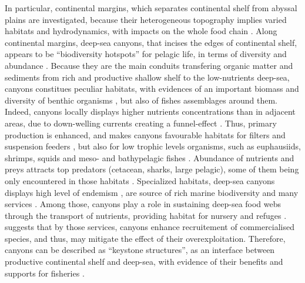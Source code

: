 In particular, continental margins, which separates continental shelf from abyssal plains are investigated, because their heterogeneous topography implies varied habitats and hydrodynamics, with impacts on the whole food chain \citep{danovaro2009,fernandez-arcaya2017}. Along continental margins, deep-sea canyons, that incises the edges of continental shelf, appears to be ``biodiversity hotspots'' for pelagic life, in terms of diversity and abundance \citep{aissi2012,danovaro2009,gillet2013,robertson2020}. Because they are the main conduits transfering organic matter and sediments from rich and productive shallow shelf to the low-nutrients deep-sea, canyons constitues peculiar habitats, with evidences of an important biomass and diversity of benthic organisms \citep{canals2006,danovaro2009,leo2012}, but also of fishes assemblages \citep{sion2019,stefanescu1994} around them. Indeed, canyons locally displays higher nutrients concentrations than in adjacent areas, due to down-welling currents creating a funnel-effect \citep{fernandez-arcaya2017}. Thus, primary production is enhanced, and makes canyons favourable habitats for filters and suspension feeders \citep{fernandez-arcaya2017,sion2019}, but also for low trophic levels organisms, such as euphausiids, shrimps, squids and meso- and bathypelagic fishes \citep{aissi2012,gaskett2001,pusch2004}. Abundance of nutrients and preys attracts top predators (cetacean, sharks, large pelagic), some of them being only encountered in those habitats \citep{aissi2012}. Specialized habitats, deep-sea canyons displays high level of endemism \citep{danovaro2009,danovaro2017}, are source of rich marine biodiversity and many services \citep{fernandez-arcaya2017}. Among those, canyons play a role in sustaining deep-sea food webs through the transport of nutrients, providing habitat for nursery and refuges \citep{fernandez-arcaya2017}. \citet{company2008} suggests that by those services, canyons enhance recruitement of commercialised species, and thus, may mitigate the effect of their overexploitation. Therefore, canyons can be described as ``keystone structures'', as an interface between productive continental shelf and deep-sea, with evidence of their benefits and supports for fisheries \citep{company2012,fernandez-arcaya2017}.

